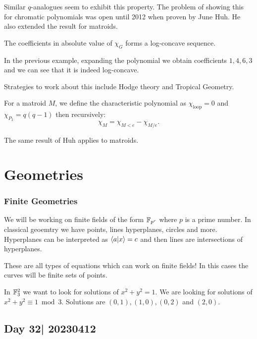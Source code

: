 \documentclass[12pt]{memoir}
\begin{document}
Similar $q$-analogues seem to exhibit this property. The problem of showing this for chromatic polynomials was open until 2012 when proven by June Huh. He also extended the result for matroids.

\begin{Th}
    The coefficients in absolute value of $\chi_G$ forms a log-concave sequence.
\end{Th}

\begin{Ex}
    In the previous example, expanding the polynomial we obtain coefficients $1,4,6,3$ and we can see that it is indeed log-concave.
\end{Ex}

Strategies to work about this include Hodge theory and Tropical Geometry.

\begin{Def}
    For a matroid $M$, we define the characteristic polynomial as $\chi_{\text{loop}}=0$ and $\chi_{P_2}=q(q-1)$ then recursively:
    $$\chi_M=\chi_{M\less e}-\chi_{M/e}.$$
\end{Def}

The same result of Huh applies to matroids.

\chapter{Geometries}

\subsection{Finite Geometries}

We will be working on finite fields of the form $\mathbb{F}_{p^r}$ where $p$ is a prime number. In classical geoemtry we have points, lines hyperplanes, circles and more. Hyperplanes can be interpreted as $\braket{a}{x}=c$ and then lines are intersections of hyperplanes.\par 
These are all types of equations which can work on finite fields! In this cases the curves will be finite sets of points.

\begin{Ex}
    In $\mathbb{F}_3^2$ we want to look for solutions of $x^2+y^2=1$. We are looking for solutions of $x^2+y^2\equiv 1\bmod 3$. Solutions are $(0,1),(1,0),(0,2)$ and $(2,0)$.
\end{Ex}

\section{Day 32| 20230412}
\end{document}
